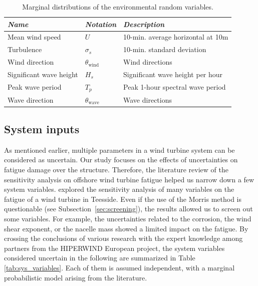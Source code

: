 \begin{table}[h!]
    \centering
    \caption{Marginal distributions of the environmental random variables.}
    \begin{tabular}{ l l l}
        \hline
        {\it Name} & {\it Notation} & {\it Description}\\
        \hline
        Mean wind speed & $U$ & 10-min. average horizontal at 10m\\
        Turbulence & $\sigma_s $ & 10-min.  standard deviation \\
        Wind direction & $\theta_{\mathrm{wind}} $ & Wind directions\\
        Significant wave height & $H_s $  & Significant wave height per hour\\
        Peak wave period & $T_p $ & Peak 1-hour spectral wave period \\
        Wave direction & $\theta_{\mathrm{wave}} $ & Wave directions\\
        \hline
    \end{tabular}
    \label{tab:envi_variables}
\end{table}

\subsection{System inputs}
As mentioned earlier, multiple parameters in a wind turbine system can be considered as uncertain. 
Our study focuses on the effects of uncertainties on fatigue damage over the structure. 
Therefore, the literature review of the sensitivity analysis on offshore wind turbine fatigue helped us narrow down a few system variables. 
\citet{petrovska_2022} explored the sensitivity analysis of many variables on the fatigue of a wind turbine in Teesside. 
Even if the use of the Morris method is questionable (see Subsection~\ref{sec:screening}), the results allowed us to screen out some variables. 
For example, the uncertainties related to the corrosion, the wind shear exponent, or the nacelle mass showed a limited impact on the fatigue.     
By crossing the conclusions of various research with the expert knowledge among partners from the HIPERWIND European project, the system variables considered uncertain in the following are summarized in Table \ref{tab:sys_variables}. 
Each of them is assumed independent, with a marginal probabilistic model arising from the literature. 


